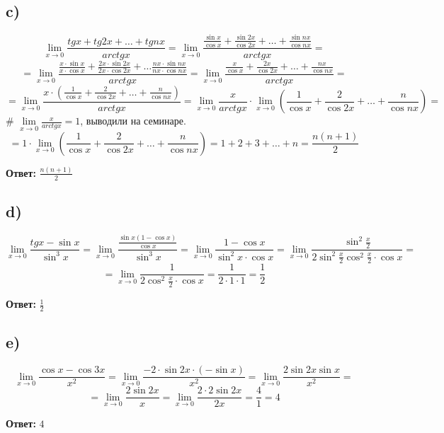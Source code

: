 \documentclass[a4paper,12pt]{article}
\begin{document}
\subsection*{c)}
\[
\lim_{x \rightarrow 0} \frac{tg x + tg2x + \ldots + tgnx}{arctg x} = \lim_{x \rightarrow 0} \frac{\frac{\sin x}{\cos x} + \frac{\sin 2x}{\cos 2x} +\ldots + \frac{\sin nx}{\cos nx}}{arctg x} = 
\]
\[
= \lim_{x \rightarrow 0} \frac{\frac{x \cdot \sin x}{x \cdot \cos x} + \frac{2x \cdot \sin 2x}{2x \cdot \cos 2x}+ \ldots \frac{nx \cdot \sin nx}{nx \cdot \cos nx}}{arctg x} = \lim_{x \rightarrow 0} \frac{\frac{x}{\cos x} + \frac{2x}{\cos 2x} + \ldots + \frac{nx}{\cos nx}}{arctg x} =
\]
\[
= \lim_{x \rightarrow 0} \frac{x \cdot \left( \frac{1}{\cos x}  + \frac{2}{\cos 2x} + \ldots + \frac{n}{\cos nx} 
\right)}{arctg x } = \lim_{x \rightarrow 0} \frac{x}{arctg x } \cdot \lim_{x \rightarrow 0} \left( \frac{1}{\cos x}  + \frac{2}{\cos 2x}+ \ldots + \frac{n}{\cos nx}  \right) =
\]
$\# $ $\lim\limits_{x \rightarrow 0} \frac{x}{arctg x}  = 1$, выводили на семинаре.
\[
= 1 \cdot \lim_{x \rightarrow 0} \left( \frac{1}{\cos x}  + \frac{2}{\cos 2x}+ \ldots + \frac{n}{\cos nx}  \right) = 1 + 2 + 3 + \ldots + n = \frac{n(n+1)}{2}
\]
\begin{center}
\textbf{Ответ: } $\frac{n(n+1)}{2}$
\end{center}

\subsection*{d)}
\[
\lim_{x \rightarrow 0} \frac{tgx - \sin x}{\sin^3 x} = \lim_{x \rightarrow 0} \frac{\frac{\sin x(1 - \cos x)}{\cos x}}{\sin ^3 x} = \lim_{x \rightarrow 0} \frac{1 - \cos x}{\sin^ 2 x \cdot \cos x} = \lim_{x \rightarrow 0} \frac{\sin^2 \frac{x}{2}}{2\sin^2 \frac{x}{2} \cos^2\frac{x}{2} \cdot \cos x} =
\]
\[
= \lim_{x \rightarrow 0} \frac{1}{2\cos^2 \frac{x}{2} \cdot \cos x} = \frac{1}{2 \cdot 1 \cdot 1} = \frac{1}{2}
\]
\begin{center}
\textbf{Ответ: } $\frac{1}{2}$
\end{center}

\subsection*{e)}
\[
\lim_{x \rightarrow 0} \frac{\cos x - \cos 3x}{x^2} = \lim_{x \rightarrow 0} \frac{-2 \cdot \sin 2x \cdot (-\sin x)}{x^2} = \lim_{x \rightarrow 0} \frac{2\sin 2x \sin x}{x^2} =
\]
\[
= \lim_{x \rightarrow 0} \frac{2\sin 2x}{x} = \lim_{x \rightarrow 0} \frac{2 \cdot 2 \sin 2x}{ 2x} = \frac{4}{1} = 4
\]
\begin{center}
\textbf{Ответ: } $4$
\end{center}
\end{document}
